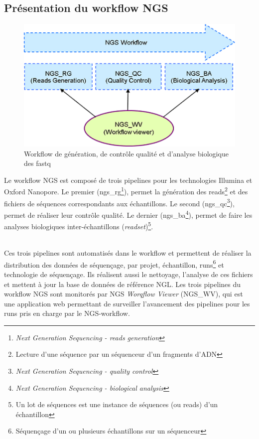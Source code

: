 \subsection{Présentation du workflow NGS}
\begin{minipage}{0.45\textwidth}
	\begin{figure}[H]
		\centering
		\includegraphics[width=1\textwidth]{img/Workflow.png}
		\caption{\footnotesize{Workflow de génération, de contrôle qualité et d’analyse biologique des fastq}}
		\label{worflow-genoscope}
	\end{figure}
\end{minipage}
\hfill
\begin{minipage}{0.45\textwidth}
	Le workflow NGS est composé de trois pipelines pour les technologies Illumina et Oxford Nanopore. Le premier (ngs\_rg\footnote{\emph{Next Generation Sequencing - reads generation}}), permet la génération des reads\footnote{Lecture d'une séquence par un séquenceur d'un fragments d'ADN} et des fichiers de séquences correspondants aux échantillons. Le second (ngs\_qc\footnote{\emph{Next Generation Sequencing - quality control}}), permet de réaliser leur contrôle qualité. Le dernier (ngs\_ba\footnote{\emph{Next Generation Sequencing - biological analysis}}), permet de faire les analyses biologiques inter-échantillons (\emph{readset})\footnote{Un lot de séquences est une instance de séquences (ou reads) d'un échantillon}. 
\end{minipage}\\[0.1cm]

Ces trois pipelines sont automatisés dans le workflow et permettent de réaliser la distribution des données de séquençage, par projet, échantillon, runs\footnote{Séquençage d'un ou plusieurs échantillons sur un séquenceur} et technologie de séquençage. Ils réalisent aussi le nettoyage, l'analyse de ces fichiers et mettent à jour la base de données de référence NGL. Les trois pipelines du workflow NGS sont monitorés par NGS \emph{Worqflow Viewer} (NGS\_WV), qui est une application web permettant de surveiller l'avancement des pipelines pour les runs pris en charge par le NGS-workflow.

